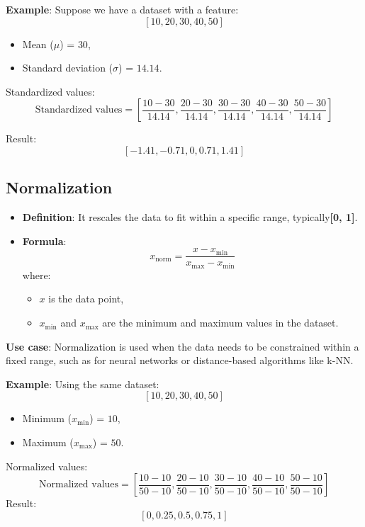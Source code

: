 \documentclass[12pt]{book}
\begin{document}
\textbf{Example}:
Suppose we have a dataset with a feature:
\[
[10, 20, 30, 40, 50]
\]
\begin{itemize}
    \item [-] Mean (\( \mu \)) = \( 30 \),
    \item [-] Standard deviation (\( \sigma \)) = \( 14.14 \).
\end{itemize}

Standardized values:
\[
\text{Standardized values} = \left[ \frac{10-30}{14.14}, \frac{20-30}{14.14}, \frac{30-30}{14.14}, \frac{40-30}{14.14}, \frac{50-30}{14.14} \right]
\]

Result:
\[
[-1.41, -0.71, 0, 0.71, 1.41]
\]


\subsection*{\textbf{Normalization}}

\begin{itemize}
    \item [-] \textbf{Definition}: It rescales the data to fit within a specific range, typically\textbf{[0, 1]}. 
    \item [-] \textbf{Formula}:
    \[
    x_{\text{norm}} = \frac{x - x_{\text{min}}}{x_{\text{max}} - x_{\text{min}}}
    \]
    where:
    \begin{itemize}
        \item [-] \( x \) is the data point,
        \item [-] \( x_{\text{min}} \) and \( x_{\text{max}} \) are the minimum and maximum values in the dataset.
    \end{itemize}

\end{itemize}


\textbf{Use case}: Normalization is used when the data needs to be constrained within a fixed range, such as for neural networks or distance-based algorithms like k-NN.

\textbf{Example}:
Using the same dataset:
\[
[10, 20, 30, 40, 50]
\]
\begin{itemize}
    \item [-] Minimum (\( x_{\text{min}} \)) = \( 10 \),
    \item [-] Maximum (\( x_{\text{max}} \)) = \( 50 \).
\end{itemize}


Normalized values:
\[
\text{Normalized values} = \left[ \frac{10-10}{50-10}, \frac{20-10}{50-10}, \frac{30-10}{50-10}, \frac{40-10}{50-10}, \frac{50-10}{50-10} \right]
\]
Result:
\[
[0, 0.25, 0.5, 0.75, 1]
\]
\end{document}
